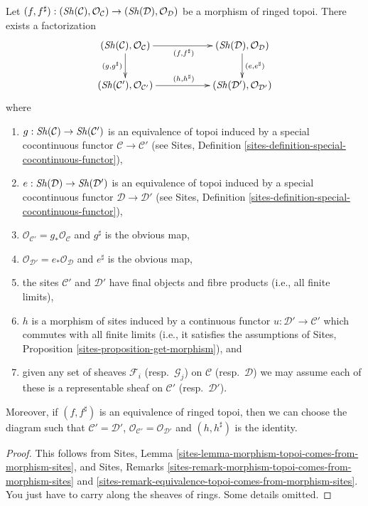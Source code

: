\begin{lemma}
\label{lemma-morphism-ringed-topoi-comes-from-morphism-ringed-sites}
Let $(f, f^\sharp) :
(\mathop{\mathit{Sh}}\nolimits(\mathcal{C}), \mathcal{O}_\mathcal{C})
\to (\mathop{\mathit{Sh}}\nolimits(\mathcal{D}), \mathcal{O}_\mathcal{D})$
be a morphism of ringed topoi. There exists a factorization
$$
\xymatrix{
(\Sh(\mathcal{C}), \mathcal{O}_\mathcal{C})
\ar[rr]_{(f, f^\sharp)}
\ar[d]_{(g, g^\sharp)}
& &
(\Sh(\mathcal{D}), \mathcal{O}_\mathcal{D}) \ar[d]^{(e, e^\sharp)}
\\
(\Sh(\mathcal{C}'), \mathcal{O}_{\mathcal{C}'})
\ar[rr]^{(h, h^\sharp)} & &
(\Sh(\mathcal{D}'), \mathcal{O}_{\mathcal{D}'})
}
$$
where
\begin{enumerate}
\item $g : \mathop{\mathit{Sh}}\nolimits(\mathcal{C}) \to \mathop{\mathit{Sh}}\nolimits(\mathcal{C}')$
is an equivalence of topoi induced by a special cocontinuous functor
$\mathcal{C} \to \mathcal{C}'$ (see
Sites, Definition \ref{sites-definition-special-cocontinuous-functor}),
\item $e : \mathop{\mathit{Sh}}\nolimits(\mathcal{D}) \to \mathop{\mathit{Sh}}\nolimits(\mathcal{D}')$
is an equivalence of topoi induced by a special cocontinuous functor
$\mathcal{D} \to \mathcal{D}'$ (see
Sites, Definition \ref{sites-definition-special-cocontinuous-functor}),
\item $\mathcal{O}_{\mathcal{C}'} = g_*\mathcal{O}_\mathcal{C}$
and $g^\sharp$ is the obvious map,
\item $\mathcal{O}_{\mathcal{D}'} = e_*\mathcal{O}_\mathcal{D}$
and $e^\sharp$ is the obvious map,
\item the sites $\mathcal{C}'$ and $\mathcal{D}'$ have final objects
and fibre products (i.e., all finite limits),
\item $h$ is a morphism of sites induced by a continuous functor
$u : \mathcal{D}' \to \mathcal{C}'$ which commutes with all finite limits
(i.e., it satisfies the assumptions of
Sites, Proposition \ref{sites-proposition-get-morphism}), and
\item given any set of sheaves $\mathcal{F}_i$ (resp.\ $\mathcal{G}_j$)
on $\mathcal{C}$ (resp.\ $\mathcal{D}$) we may assume each of these is
a representable sheaf on $\mathcal{C}'$ (resp.\ $\mathcal{D}'$).
\end{enumerate}
Moreover, if $(f, f^\sharp)$ is an equivalence of ringed topoi,
then we can choose the diagram such that
$\mathcal{C}' = \mathcal{D}'$,
$\mathcal{O}_{\mathcal{C}'} = \mathcal{O}_{\mathcal{D}'}$
and $(h, h^\sharp)$ is the identity.
\end{lemma}

\begin{proof}
This follows from
Sites, Lemma \ref{sites-lemma-morphism-topoi-comes-from-morphism-sites},
and
Sites, Remarks
\ref{sites-remark-morphism-topoi-comes-from-morphism-sites} and
\ref{sites-remark-equivalence-topoi-comes-from-morphism-sites}.
You just have to carry along the sheaves of rings. Some details omitted.
\end{proof}







